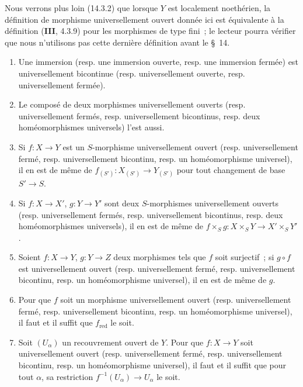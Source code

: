Nous verrons plus loin (14.3.2) que lorsque $Y$ est localement noethérien, la
définition de morphisme universellement ouvert donnée ici est équivalente à la
définition (\textbf{III}, 4.3.9) pour les morphismes de type fini~; le lecteur pourra
vérifier que nous n'utilisons pas cette dernière définition avant le \S~14.

\begin{proposition}[2.4.3]
\begin{enumerate}
\item[\textup{(i)}] Une immersion \textup{(resp.} une immersion ouverte, \textup{resp.} une immersion
fermée) est universellement bicontinue \textup{(resp.} universellement ouverte, \textup{resp.}
universellement fermée).
\item[\textup{(ii)}] Le composé de deux morphismes universellement ouverts \textup{(resp.}
universellement fermés, \textup{resp.} universellement bicontinus, \textup{resp.} deux
homéomorphismes universels) l'est aussi.
\item[\textup{(iii)}] Si $f:X\to Y$ est un $S$-morphisme universellement ouvert \textup{(resp.}
universellement fermé, \textup{resp.} universellement bicontinu, \textup{resp.} un
homéomorphisme universel), il en est de même de
$f_{(S')}:X_{(S')}\to Y_{(S')}$ pour tout changement de base $S'\to S$.
\item[\textup{(iv)}] Si $f:X\to X'$, $g:Y\to Y'$ sont deux $S$-morphismes
universellement ouverts \textup{(resp.} universellement fermés, \textup{resp.} universellement
bicontinus, \textup{resp.} deux homéomorphismes universels), il en est de même de
$f\times_S g:X\times_S Y\to X'\times_S Y'$.
\item[\textup{(v)}] Soient $f:X\to Y$, $g:Y\to Z$ deux morphismes tels que $f$ soit
surjectif~; si $g\circ f$ est universellement ouvert \textup{(resp.} universellement
fermé, \textup{resp.} universellement bicontinu, \textup{resp.} un homéomorphisme universel), il
en est de même de $g$.
\item[\textup{(vi)}] Pour que $f$ soit un morphisme universellement ouvert \textup{(resp.}
universellement fermé, \textup{resp.} universellement bicontinu, \textup{resp.} un
homéomorphisme universel), il faut et il suffit que $f_{\mathrm{red}}$ le soit.
\item[\textup{(vii)}] Soit $(U_\alpha)$ un recouvrement ouvert de $Y$. Pour que
$f:X\to Y$ soit universellement ouvert \textup{(resp.} universellement fermé, \textup{resp.}
universellement bicontinu, \textup{resp.} un homéomorphisme universel), il faut et il
suffit que pour tout $\alpha$, sa restriction
$f^{-1}(U_\alpha)\to U_\alpha$ le soit.
\end{enumerate}
\end{proposition}

